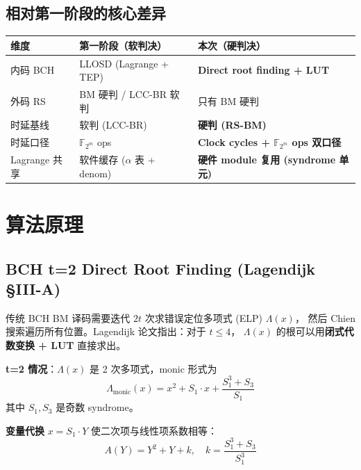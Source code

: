 \documentclass[11pt,a4paper]{article}
\begin{document}
\subsection{相对第一阶段的核心差异}

\begin{table}[!ht]
\centering
\begin{tabularx}{\textwidth}{lXX}
\toprule
\textbf{维度} & \textbf{第一阶段（软判决）} & \textbf{本次（硬判决）} \\
\midrule
内码 BCH   & LLOSD (Lagrange + TEP)          & \textbf{Direct root finding + LUT} \\
外码 RS    & BM 硬判 / LCC-BR 软判            & 只有 BM 硬判 \\
时延基线   & 软判 (LCC-BR)                    & \textbf{硬判 (RS-BM)} \\
时延口径   & $\mathbb{F}_{2^m}$ ops           & \textbf{Clock cycles + $\mathbb{F}_{2^m}$ ops 双口径} \\
Lagrange 共享 & 软件缓存 ($\alpha$ 表 + denom) & \textbf{硬件 module 复用 (syndrome 单元)} \\
\bottomrule
\end{tabularx}
\end{table}

\section{算法原理}

\subsection{BCH t=2 Direct Root Finding (Lagendijk §III-A)}

传统 BCH BM 译码需要迭代 $2t$ 次求错误定位多项式 (ELP) $\Lambda(x)$，
然后 Chien 搜索遍历所有位置。Lagendijk 论文指出：对于 $t \leq 4$，
$\Lambda(x)$ 的根可以用\textbf{闭式代数变换 + LUT} 直接求出。

\textbf{t=2 情况}：$\Lambda(x)$ 是 2 次多项式，monic 形式为
\begin{equation}
\Lambda_{\text{monic}}(x) = x^2 + S_1 \cdot x + \frac{S_1^3 + S_3}{S_1}
\end{equation}
其中 $S_1, S_3$ 是奇数 syndrome。

\textbf{变量代换} $x = S_1 \cdot Y$ 使二次项与线性项系数相等：
\begin{equation}
A(Y) = Y^2 + Y + k, \quad k = \frac{S_1^3 + S_3}{S_1^3}
\end{equation}
\end{document}
